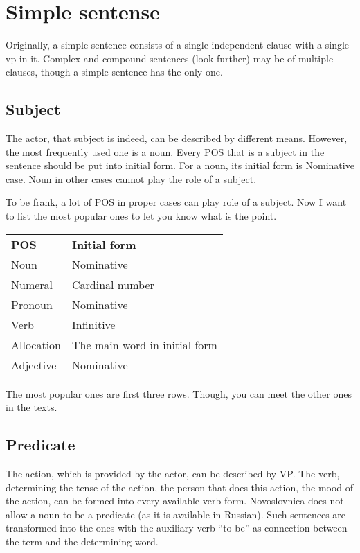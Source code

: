 \section{Simple sentense}

Originally, a simple sentence consists of a single independent clause with a single \gls{vp} in it. Complex and compound sentences (look further) may be of multiple clauses, though a simple sentence has the only one.

\subsection{Subject}

The actor, that subject is indeed, can be described by different means. However, the most frequently used one is a noun.  Every POS that is a subject in the sentence should be put into initial form. For a noun, its initial form is Nominative case. Noun in other cases cannot play the role of a subject.

To be frank, a lot of POS in proper cases can play role of a subject. Now I want to list the most popular ones to let you know what is the point.

\begin{table}[h]
	\begin{tabular}{ll}
		\textbf{POS} & \textbf{Initial form} \\
		Noun & Nominative \\
		Numeral & Cardinal number \\
		Pronoun & Nominative \\
		Verb & Infinitive \\
		Allocation & The main word in initial form \\
		Adjective & Nominative \\
	\end{tabular}
\end{table}

The most popular ones are first three rows. Though, you can meet the other ones in the texts.

\subsection{Predicate}
The action, which is provided by the actor, can be described by VP. The verb, determining the tense of the action, the person that does this action, the mood of the action, can be formed into every available verb form. Novoslovnica does not allow a noun to be a predicate (as it is available in Russian). Such sentences are transformed into the ones with the auxiliary verb “to be” as connection between the term and the determining word.

